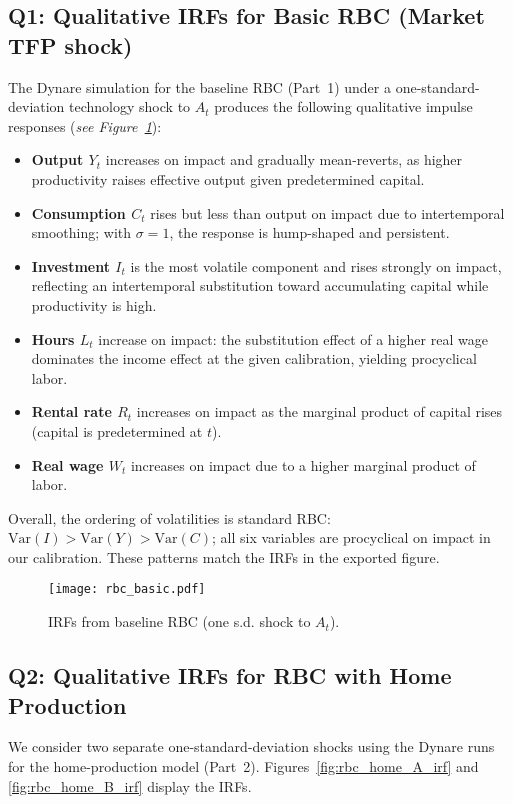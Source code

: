 \documentclass[a4paper,12pt]{article}
\theoremstyle{nonitalic}
\begin{document}
\subsection*{Q1: Qualitative IRFs for Basic RBC (Market TFP shock)}
The Dynare simulation for the baseline RBC (Part~1) under a one-standard-deviation technology shock to $A_t$ produces the following qualitative impulse responses (\emph{see Figure~\ref{fig:rbc_basic_irf}}):
\begin{itemize}
  \item \textbf{Output $Y_t$} increases on impact and gradually mean-reverts, as higher productivity raises effective output given predetermined capital.
  \item \textbf{Consumption $C_t$} rises but less than output on impact due to intertemporal smoothing; with $\sigma=1$, the response is hump-shaped and persistent.
  \item \textbf{Investment $I_t$} is the most volatile component and rises strongly on impact, reflecting an intertemporal substitution toward accumulating capital while productivity is high.
  \item \textbf{Hours $L_t$} increase on impact: the substitution effect of a higher real wage dominates the income effect at the given calibration, yielding procyclical labor.
  \item \textbf{Rental rate $R_t$} increases on impact as the marginal product of capital rises (capital is predetermined at $t$).
  \item \textbf{Real wage $W_t$} increases on impact due to a higher marginal product of labor.
\end{itemize}
Overall, the ordering of volatilities is standard RBC: $\mathrm{Var}(I)>\mathrm{Var}(Y)>\mathrm{Var}(C)$; all six variables are procyclical on impact in our calibration. These patterns match the IRFs in the exported figure.

\begin{figure}[H]
  \centering
  \texttt{[image: rbc\_basic.pdf]}
  \caption{IRFs from baseline RBC (one s.d. shock to $A_t$).}
  \label{fig:rbc_basic_irf}
\end{figure}
\FloatBarrier

\subsection*{Q2: Qualitative IRFs for RBC with Home Production}
We consider two separate one-standard-deviation shocks using the Dynare runs for the home-production model (Part~2). Figures~\ref{fig:rbc_home_A_irf} and \ref{fig:rbc_home_B_irf} display the IRFs.
\end{document}
